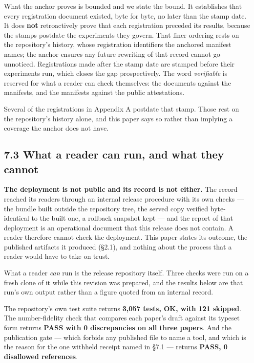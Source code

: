 \documentclass[11pt]{article}
\begin{document}
What the anchor proves is bounded and we state the bound. It establishes that every registration document existed, byte for byte, no later than the stamp date. It does \textbf{not} retroactively prove that each registration preceded its results, because the stamps postdate the experiments they govern. That finer ordering rests on the repository's history, whose registration identifiers the anchored manifest names; the anchor ensures any future rewriting of that record cannot go unnoticed. Registrations made after the stamp date are stamped before their experiments run, which closes the gap prospectively. The word \emph{verifiable} is reserved for what a reader can check themselves: the documents against the manifests, and the manifests against the public attestations.

Several of the registrations in Appendix A postdate that stamp. Those rest on the repository's history alone, and this paper says so rather than implying a coverage the anchor does not have.

\subsection*{7.3 What a reader can run, and what they cannot}

\textbf{The deployment is not public and its record is not either.} The record reached its readers through an internal release procedure with its own checks --- the bundle built outside the repository tree, the served copy verified byte-identical to the built one, a rollback snapshot kept --- and the report of that deployment is an operational document that this release does not contain. A reader therefore cannot check the deployment. This paper states its outcome, the published artifacts it produced (\S{}2.1), and nothing about the process that a reader would have to take on trust.

What a reader \emph{can} run is the release repository itself. Three checks were run on a fresh clone of it while this revision was prepared, and the results below are that run's own output rather than a figure quoted from an internal record.

The repository's own test suite returns \textbf{3,057 tests, OK, with 121 skipped}. The number-fidelity check that compares each paper's draft against its typeset form returns \textbf{PASS with 0 discrepancies on all three papers}. And the publication gate --- which forbids any published file to name a tool, and which is the reason for the one withheld receipt named in \S{}7.1 --- returns \textbf{PASS, 0 disallowed references}.
\end{document}
